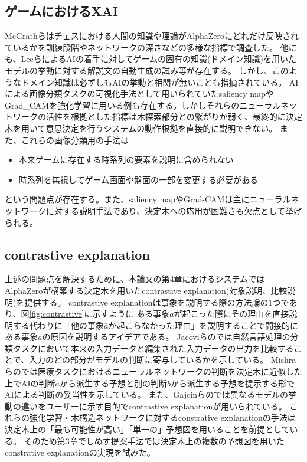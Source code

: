 \subsection{ゲームにおけるXAI}
McGrathら\cite{DeepMind}はチェスにおける人間の知識や理論がAlphaZeroにどれだけ反映されているかを訓練段階やネットワークの深さなどの多様な指標で調査した。
他にも、Leeら\cite{DecodeChess}によるAIの着手に対してゲームの固有の知識(ドメイン知識)を用いたモデルの挙動に対する解説文の自動生成の試み等が存在する。
しかし、このようなドメイン知識は必ずしもAIの挙動と相関が無いことも指摘されている\cite{DeepMind}。
AIによる画像分類タスクの可視化手法として用いられていたsaliency map\cite{saliency}やGrad\_CAM\cite{Grad-CAM}を強化学習に用いる例も存在する\cite{gl}\cite{atari-saliency}\cite{visualize}。しかしそれらのニューラルネットワークの活性を根拠とした指標は木探索部分との繋がりが弱く、最終的に決定木を用いて意思決定を行うシステムの動作根拠を直接的に説明できない。
また、これらの画像分類用の手法は
\begin{itemize}
	\item 本来ゲームに存在する時系列の要素を説明に含められない
	\item 時系列を無視してゲーム画面や盤面の一部を変更する必要がある
\end{itemize}
という問題点が存在する。また、saliency mapやGrad-CAMは主にニューラルネットワークに対する説明手法であり、決定木への応用が困難さも欠点として挙げられる。

\subsection{contrastive explanation}
上述の問題点を解決するために、本論文の第4章におけるシステムではAlphaZeroが構築する決定木を用いたcontrastive explanation(対象説明、比較説明)を提供する。
contrastive explanationは事象を説明する際の方法論の1つであり、図\ref{fig:contrastive}に示すように
ある事象$a$が起こった際にその理由を直接説明する代わりに「他の事象$\bar{a}$が起こらなかった理由」を説明することで間接的にある事象$a$の原因を説明するアイデアである\cite{contrastive}。
Jacoviらの\cite{contrastive}では自然言語処理の分類タスクにおいて本来の入力データと編集された入力データの出力を比較することで、入力のどの部分がモデルの判断に寄与しているかを示している。
Mishraらの\cite{whyNot}では医療タスクにおけるニューラルネットワークの判断を決定木に近似した上でAIの判断$a$から派生する予想と別の判断$b$から派生する予想を提示する形でAIによる判断の妥当性を示している。
また、Gajcinらの\cite{preference}では異なるモデルの挙動の違いをユーザーに示す目的でcontrastive explanationが用いられている。
これらの強化学習・木構造ネットワークに対するconstrative explanationの手法は決定木上の「最も可能性が高い」「単一の」予想図を用いることを前提としている。
そのため第3章でしめす提案手法では決定木上の複数の予想図を用いたconstrative explanationの実現を試みた。

